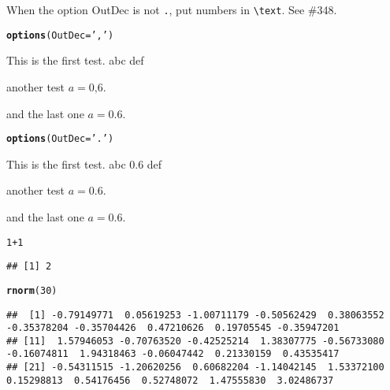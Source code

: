 \documentclass{article}\usepackage[]{graphicx}\usepackage[]{xcolor}
\makeatletter
\newcommand{\hlnum}[1]{\textcolor[rgb]{0.686,0.059,0.569}{#1}}%
\newcommand{\hlstr}[1]{\textcolor[rgb]{0.192,0.494,0.8}{#1}}%
\newcommand{\hlopt}[1]{\textcolor[rgb]{0,0,0}{#1}}%
\newcommand{\hlstd}[1]{\textcolor[rgb]{0.345,0.345,0.345}{#1}}%
\newcommand{\hlkwc}[1]{\textcolor[rgb]{0.333,0.667,0.333}{#1}}%
\newcommand{\hlkwd}[1]{\textcolor[rgb]{0.737,0.353,0.396}{\textbf{#1}}}%
\newenvironment{kframe}{%
 \def\at@end@of@kframe{}%
 \ifinner\ifhmode%
  \def\at@end@of@kframe{\end{minipage}}%
  \begin{minipage}{\columnwidth}%
 \fi\fi%
 \def\FrameCommand##1{\hskip\@totalleftmargin \hskip-\fboxsep
 \colorbox{shadecolor}{##1}\hskip-\fboxsep
     \hskip-\linewidth \hskip-\@totalleftmargin \hskip\columnwidth}%
 \MakeFramed {\advance\hsize-\width
   \@totalleftmargin\z@ \linewidth\hsize
   \@setminipage}}%
 {\par\unskip\endMakeFramed%
 \at@end@of@kframe}
\newenvironment{knitrout}{}{} %
\makeatother
\begin{document}
When the option OutDec is not \texttt{.}, put numbers in \texttt{\textbackslash{}text}. See \#348.

\begin{knitrout}
\color{fgcolor}\begin{kframe}
\begin{alltt}
\hlkwd{options}\hlstd{(}\hlkwc{OutDec} \hlstd{=} \hlstr{','}\hlstd{)}
\end{alltt}
\end{kframe}
\end{knitrout}

This is the first test. abc  def

another test $a = \text{0,6}$.

and the last one $a = 0.6$.

\begin{knitrout}
\color{fgcolor}\begin{kframe}
\begin{alltt}
\hlkwd{options}\hlstd{(}\hlkwc{OutDec} \hlstd{=} \hlstr{'.'}\hlstd{)}
\end{alltt}
\end{kframe}
\end{knitrout}

This is the first test. abc 0.6 def

another test $a = 0.6$.

and the last one $a = 0.6$.

\begin{knitrout}
\color{fgcolor}\begin{kframe}
\begin{alltt}
\hlnum{1}\hlopt{+}\hlnum{1}
\end{alltt}
\begin{verbatim}
## [1] 2
\end{verbatim}
\begin{alltt}
\hlkwd{rnorm}\hlstd{(}\hlnum{30}\hlstd{)}
\end{alltt}
\begin{verbatim}
##  [1] -0.79149771  0.05619253 -1.00711179 -0.50562429  0.38063552 -0.35378204 -0.35704426  0.47210626  0.19705545 -0.35947201
## [11]  1.57946053 -0.70763520 -0.42525214  1.38307775 -0.56733080 -0.16074811  1.94318463 -0.06047442  0.21330159  0.43535417
## [21] -0.54311515 -1.20620256  0.60682204 -1.14042145  1.53372100  0.15298813  0.54176456  0.52748072  1.47555830  3.02486737
\end{verbatim}
\end{kframe}
\end{knitrout}
\end{document}
